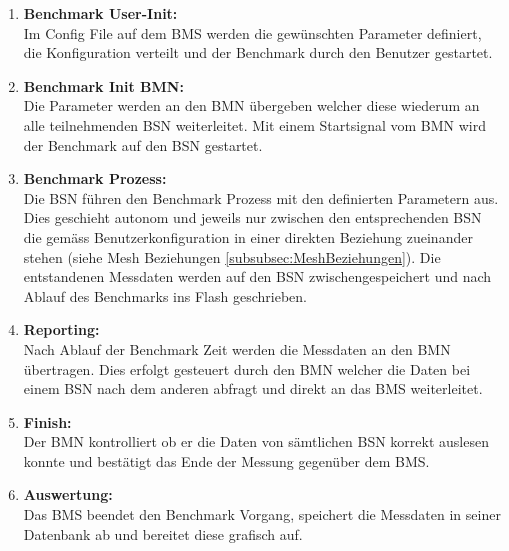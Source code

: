 \begin{enumerate}
	\item \textbf{Benchmark User-Init:}\\
	Im Config File auf dem BMS werden die gewünschten Parameter definiert, die Konfiguration verteilt und der Benchmark durch den Benutzer gestartet.
	\item \textbf{Benchmark Init BMN:}\\
	Die Parameter werden an den BMN übergeben welcher diese wiederum an alle teilnehmenden BSN weiterleitet. Mit einem Startsignal vom BMN wird der Benchmark auf den BSN gestartet.
	\item \textbf{Benchmark Prozess:}\\
	Die BSN führen den Benchmark Prozess mit den definierten Parametern aus. Dies geschieht autonom und jeweils nur zwischen den entsprechenden BSN die gemäss Benutzerkonfiguration in einer direkten Beziehung zueinander stehen (siehe Mesh Beziehungen \ref{subsubsec:MeshBeziehungen}). Die entstandenen Messdaten werden auf den BSN zwischengespeichert und nach Ablauf des Benchmarks ins Flash geschrieben.
	\item \textbf{Reporting:}\\
	Nach Ablauf der Benchmark Zeit werden die Messdaten an den BMN übertragen. Dies erfolgt gesteuert durch den BMN welcher die Daten bei einem BSN nach dem anderen abfragt und direkt an das BMS weiterleitet.
	\item \textbf{Finish:}\\
	Der BMN kontrolliert ob er die Daten von sämtlichen BSN korrekt auslesen konnte und bestätigt das Ende der Messung gegenüber dem BMS.
	\item \textbf{Auswertung:}\\
	Das BMS beendet den Benchmark Vorgang, speichert die Messdaten in seiner Datenbank ab und bereitet diese grafisch auf. 
\end{enumerate}

